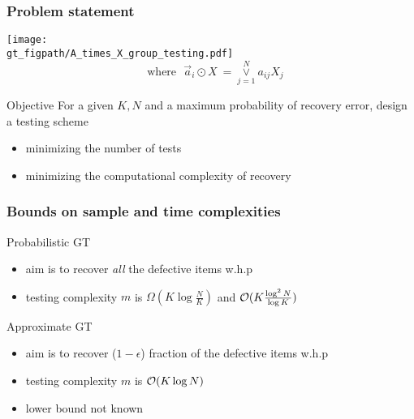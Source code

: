 \begin{frame} \frametitle{Problem statement}
\centering
\texttt{[image: \\gt\_figpath/A\_times\_X\_group\_testing.pdf]}
\[
~~\text{ where~~}		\vec{a}_i\odot X ~= \overset{N}{\underset{j=1}{\vee}} a_{ij}X_j 
\]
\pause
\begin{block}{Objective}
For a given $K,N$ and a maximum probability of recovery error, design a testing scheme
\begin{itemize}
\item minimizing the number of tests
\item minimizing the computational complexity of recovery 
\end{itemize} 
\end{block}
\end{frame}
\begin{frame} \frametitle{Bounds on sample and time complexities}
\begin{block}{Probabilistic GT}
\begin{itemize}
\item aim is to recover \emph{all} the defective items w.h.p
\item testing complexity $m$ is $\Omega(K\log \frac{N}{K})$ and $\mathcal{O}(K\frac{\log^2 N}{\log K})$
\end{itemize}
\end{block}

\pause
\vspace{6ex}
\begin{block}{Approximate GT}
\begin{itemize}
\item aim is to recover ($1-\epsilon$) fraction of the defective items w.h.p
\item testing complexity $m$ is $\mathcal{O}(K\log N)$
\item lower bound not known
\end{itemize}
\end{block}

\end{frame}

